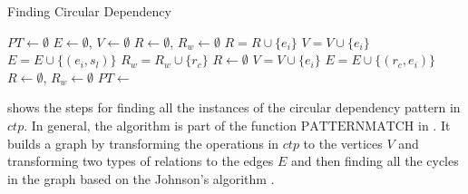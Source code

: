 \begin{algorithm}
\caption{Finding Circular Dependency}\label{algo:circular}
\begin{algorithmic}[1]
\State $\mathit{PT} \gets \emptyset$
\State $\mathit{E} \gets \emptyset$, $\mathit{V} \gets \emptyset$
\State $\mathit{R} \gets \emptyset$, $\mathit{R_w} \gets \emptyset$
\State $\mathit{R} = \mathit{R} \cup \{\mathit{e_i}\}$
\State $\mathit{V} = \mathit{V} \cup \{\mathit{e_i}\}$
 
\State $\mathit{E} = \mathit{E} \cup \{(\mathit{e_i},\mathit{s_l})\}$  
\EndFor
\EndIf
{}
\State $\mathit{R_w} = \mathit{R_w} \cup \{\mathit{r_c}\}$
\EndFor
\State $\mathit{R} \gets \emptyset$ 
\EndIf
{}
\State $\mathit{V} = \mathit{V} \cup \{\mathit{e_i}\}$
  
\State $\mathit{E} = \mathit{E} \cup \{(\mathit{r_c},\mathit{e_i})\}$
\EndFor
\EndIf
\EndFor
\State $\mathit{R} \gets \emptyset$, $\mathit{R_w} \gets \emptyset$
\EndFor
\State $\mathit{PT} \gets$ 
\end{algorithmic}
\end{algorithm}

 shows the steps for finding all the instances of the circular dependency pattern in $\mathit{ctp}$. In general, the algorithm is part of the function $\mathrm{PATTERNMATCH}$ in . It builds a graph by transforming the operations in $\mathit{ctp}$ to the vertices $\mathit{V}$ and transforming two types of relations to the edges $\mathit{E}$ and then finding all the cycles in the graph based on the Johnson's algorithm \cite{DBLP:journals/siamcomp/Johnson75}.
 
